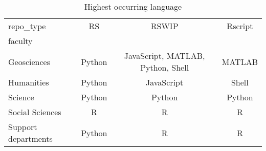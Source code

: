 \begin{table}
\centering
\caption{Highest occurring language}
\label{tab:highest_language}
\begin{tabular}{lccc}
\toprule
repo\_type &      RS &                              RSWIP & Rscript \\
faculty             &         &                                    &         \\
\midrule
Geosciences         &  Python &  JavaScript, MATLAB, Python, Shell &  MATLAB \\
Humanities          &  Python &                         JavaScript &   Shell \\
Science             &  Python &                             Python &  Python \\
Social Sciences     &       R &                                  R &       R \\
Support departments &  Python &                                  R &       R \\
\bottomrule
\end{tabular}
\end{table}
